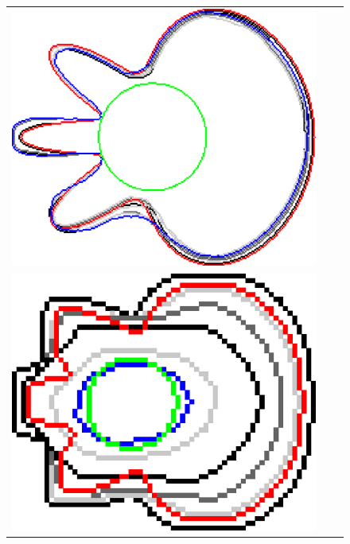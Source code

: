 \begin{figure}
\begin{tabular}{ccc}
\includegraphics[scale=0.25]{figures/chapter5/flow/flower/radius_3/mdca/elastica/len_pen_0.01000/jonctions_1/best/gs_0.25000/summary.pdf}\\[2em]
\includegraphics[scale=0.25]{figures/chapter5/mdca-larger-neighborhood/flower/0.01/1.0/summary.pdf} &

\end{tabular}
\end{figure}
